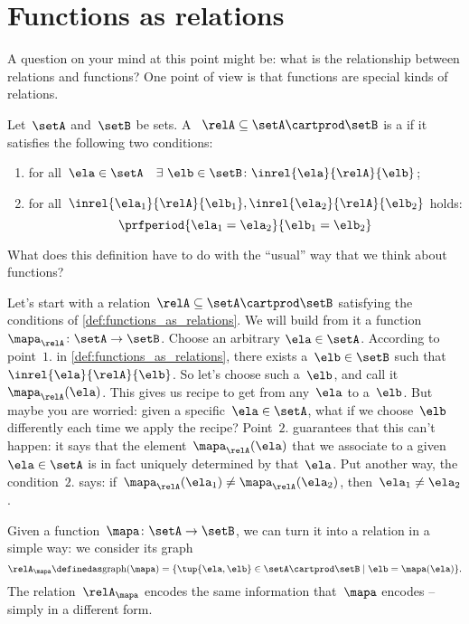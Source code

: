
\section{Functions as relations}

A question on your mind at this point might be: what is the relationship between relations and functions?
One point of view is that functions are special kinds of relations.

\begin{definition}
	\label{def:functions_as_relations}
	Let~$\setA$ and~$\setB$ be sets.
	A ~$\relA \subseteq \setA \cartprod \setB$ is a \emph{} if it satisfies the following two conditions:
	\begin{enumerate}
		\item for all~$\ela \in \setA \quad \exists \ \elb \in \setB\colon  \inrel{\ela}{\relA}{\elb}$;
		\item for all~$\inrel{\ela_1}{\relA}{\elb_1}, \inrel{\ela_2}{\relA}{\elb_2}$ holds:
		      \begin{equation*}
			      \prfperiod{\ela_1 = \ela_2}{\elb_1 = \elb_2}
		      \end{equation*}
	\end{enumerate}
\end{definition}

What does this definition have to do with the ``usual'' way that we think about functions?

Let's start with a relation~$\relA \subseteq \setA \cartprod \setB$ satisfying the conditions of \cref{def:functions_as_relations}.
We will build from it a function~$\mapa_\relA \colon \setA \to \setB$.
Choose an arbitrary $\ela \in \setA$.
According to point~$1.
$ in \cref{def:functions_as_relations}, there exists a~$\elb \in \setB$ such that~$\inrel{\ela}{\relA}{\elb}$.
So let's choose such a~$\elb$, and call it~$\mapa_\relA(\ela)$.
This gives us recipe to get from any~$\ela$ to a~$\elb$.
But maybe you are worried: given a specific~$\ela \in \setA$, what if we choose~$\elb$ differently each time we apply the recipe?
Point~$2.
$ guarantees that this can't happen: it says that the element~$\mapa_\relA(\ela)$ that we associate to a given~$\ela \in \setA$ is in fact uniquely determined by that~$\ela$.
Put another way, the condition~$2.
$ says: if~$\mapa_\relA(\ela_1) \neq \mapa_\relA(\ela_2)$, then~$\ela_1 \neq\ela_2$.

Given a function~$\mapa \colon \setA \to \setB$, we can turn it into a relation in a simple way: we consider its graph
\begin{equation*}
	\relA_\mapa \definedas \text{graph}(\mapa) = \{ \tup{\ela,\elb} \in \setA \cartprod \setB \mid \elb= \mapa(\ela) \}.
\end{equation*}
The relation~$\relA_\mapa$ encodes the same information that~$\mapa$ encodes -- simply in a different form.

